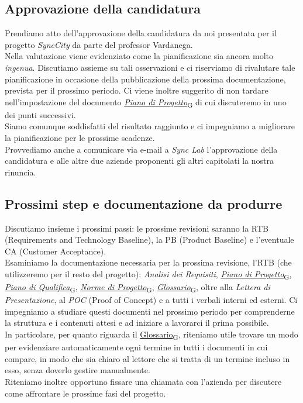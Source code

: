 \documentclass[italian,12pt]{article} %
\begin{document}
\subsection{Approvazione della candidatura}
Prendiamo atto dell'approvazione della candidatura da noi presentata per il progetto
\textit{SyncCity} da parte del professor Vardanega. \\
Nella valutazione viene evidenziato come la pianificazione sia ancora molto \textit{ingenua}.
Discutiamo assieme su tali osservazioni e ci riserviamo di rivalutare tale
pianificazione in occasione della pubblicazione della prossima documentazione,
prevista per il prossimo periodo. Ci viene inoltre suggerito di
non tardare nell'impostazione del documento \href{https://7last.github.io/docs/rtb/documentazione-interna/glossario#piano-di-progetto}{\textit{Piano di Progetto}\textsubscript{G}} di cui
discuteremo in uno dei punti successivi. \\
Siamo comunque soddisfatti del risultato raggiunto e ci impegniamo a migliorare la
pianificazione per le prossime scadenze. \\
Provvediamo anche a comunicare via e-mail a \textit{Sync Lab} l'approvazione della
candidatura e alle altre due aziende proponenti gli altri capitolati la nostra
rinuncia.

\subsection{Prossimi step e documentazione da produrre}
Discutiamo insieme i prossimi passi: le prossime revisioni saranno la RTB
(Requirements and Technology Baseline), la PB (Product Baseline) e l'eventuale CA
(Customer Acceptance).\\
Esaminiamo la documentazione necessaria per la prossima revisione, l'RTB (che
utilizzeremo per il resto del progetto): \textit{Analisi dei Requisiti},
\href{https://7last.github.io/docs/rtb/documentazione-interna/glossario#piano-di-progetto}{\textit{Piano di Progetto}\textsubscript{G}}, \href{https://7last.github.io/docs/rtb/documentazione-interna/glossario#piano-di-qualifica}{\textit{Piano di Qualifica}\textsubscript{G}}, \href{https://7last.github.io/docs/rtb/documentazione-interna/glossario#norme-di-progetto}{\textit{Norme di Progetto}\textsubscript{G}},
\href{https://7last.github.io/docs/rtb/documentazione-interna/glossario#glossario}{\textit{Glossario}\textsubscript{G}},  oltre alla \textit{Lettera di Presentazione}, al \textit{POC}
(Proof of Concept) e a tutti i verbali interni ed esterni. Ci impegniamo a studiare
questi documenti nel prossimo periodo per comprenderne la struttura e i contenuti
attesi e ad iniziare a lavorarci il prima possibile. \\
In particolare, per quanto riguarda il \href{https://7last.github.io/docs/rtb/documentazione-interna/glossario#glossario}{Glossario\textsubscript{G}}, riteniamo utile trovare un modo
per evidenziare automaticamente ogni termine in tutti i documenti in cui compare,
in modo che sia chiaro al lettore che si tratta di un termine incluso in esso,
senza doverlo gestire manualmente. \\
Riteniamo inoltre opportuno fissare una chiamata con l'azienda per discutere
come affrontare le prossime fasi del progetto.
\end{document}
